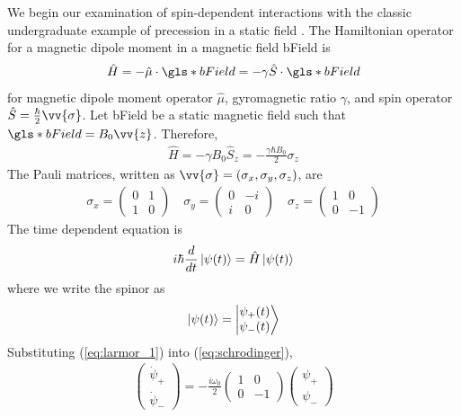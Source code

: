 
We begin our examination of spin-dependent interactions with the classic undergraduate example of precession in a static field \cite{griffiths_quantum}. The Hamiltonian operator for a magnetic dipole moment in a magnetic field \gls*{bField} is
%
\begin{align}
    \hat{H}=-\hat{\mu}\cdot\gls*{bField}=-\gamma\hat{S}\cdot \gls*{bField}\label{eq:hamiltonian_operator}
\end{align}
%
for magnetic dipole moment operator $\hat{\mu}$, gyromagnetic ratio $\gamma$, and spin operator $\hat{S}=\frac{\hbar}{2}\vv{\sigma}$. Let \gls*{bField} be a static magnetic field such that $\gls*{bField}=B_0 \vv{z}$. Therefore,
%
\begin{gather}
    \hat{H}=-\gamma B_0 \hat{S}_z=-\frac{\gamma \hbar B_0}{2}\sigma_z\label{eq:larmor_1}
\end{gather}
%
The Pauli matrices, written as $\vv{\sigma}=(\sigma_x, \sigma_y, \sigma_z)$, are
%
\begin{gather}
    \sigma_{x}=\left(\begin{matrix}
    0 & 1\\
    1 & 0
    \end{matrix}\right)\quad
    \sigma_{y}=\left(\begin{matrix}
    0 & -i\\
    i & 0
    \end{matrix}\right)\quad
    \sigma_{z}=\left(\begin{matrix}
    1 & 0\\
    0 & -1
    \end{matrix}\right)
\end{gather}
%
The time dependent \schrodinger equation is
%
\begin{gather}
    i\hbar\frac{d}{dt}\Ket{\psi(t)}=\hat{H}\Ket{\psi(t)} \label{eq:schrodinger}
\end{gather}
%
where we write the spinor as 
\begin{gather}
    \Ket{\psi(t)}=\Ket{\begin{matrix}
        \psi_+(t)\\
        \psi_-(t)
    \end{matrix}}\label{eq:spinor}  
\end{gather}
%
Substituting (\ref{eq:larmor_1}) into (\ref{eq:schrodinger}),
\begin{gather}
    \left(\begin{matrix}
        \dot{\psi}_+\\
        \dot{\psi}_-
    \end{matrix}\right)
    = -\frac{i\omega_0}{2}
    \left(\begin{matrix}
        1 & 0\\
        0 & -1
    \end{matrix} \right)
    \left(\begin{matrix}
        \psi_+\\
        \psi_-
    \end{matrix}\right)\label{eq:larmor_2}
\end{gather}
